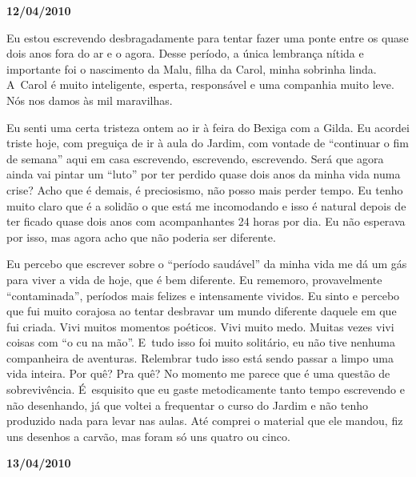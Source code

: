 \begin{center}\asterisc{}\end{center}

 \begin{flushright}\textbf{12/04/2010}\end{flushright}


Eu estou escrevendo desbragadamente para tentar fazer uma ponte entre os
quase dois anos fora do ar e o agora. Desse período, a única lembrança
nítida e importante foi o nascimento da Malu, filha da Carol, minha
sobrinha linda. A~Carol é muito inteligente, esperta, responsável e uma
companhia muito leve. Nós nos damos às mil maravilhas.

Eu senti uma certa tristeza ontem ao ir à feira do Bexiga com a Gilda.
Eu acordei triste hoje, com preguiça de ir à aula do Jardim, com vontade
de ``continuar o fim de semana'' aqui em casa escrevendo, escrevendo,
escrevendo. Será que agora ainda vai pintar um ``luto'' por ter perdido
quase dois anos da minha vida numa crise? Acho que é demais, é
preciosismo, não posso mais perder tempo. Eu tenho muito claro que é a
solidão o que está me incomodando e isso é natural depois de ter ficado
quase dois anos com acompanhantes 24 horas por dia. Eu não esperava por
isso, mas agora acho que não poderia ser diferente.

Eu percebo que escrever sobre o ``período saudável'' da minha vida me dá
um gás para viver a vida de hoje, que é bem diferente. Eu rememoro,
provavelmente ``contaminada'', períodos mais felizes e intensamente
vividos. Eu sinto e percebo que fui muito corajosa ao tentar desbravar
um mundo diferente daquele em que fui criada. Vivi muitos momentos
poéticos. Vivi muito medo. Muitas vezes vivi coisas com ``o cu na mão''.
E~tudo isso foi muito solitário, eu não tive nenhuma companheira de
aventuras. Relembrar tudo isso está sendo passar a limpo uma vida
inteira. Por quê? Pra quê? No momento me parece que é uma questão de
sobrevivência. É~esquisito que eu gaste metodicamente tanto tempo
escrevendo e não desenhando, já que voltei a frequentar o curso do
Jardim e não tenho produzido nada para levar nas aulas. Até comprei o
material que ele mandou, fiz uns desenhos a carvão, mas foram só uns
quatro ou cinco.

\begin{center}\asterisc{}\end{center}

 \begin{flushright}\textbf{13/04/2010}\end{flushright}


